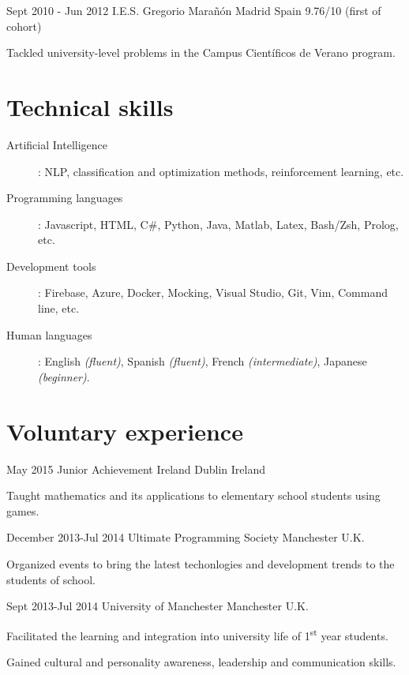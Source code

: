 \documentclass[10pt]{CurriculumVitae}
\begin{document}
      {Sept 2010 - Jun 2012}
      {I.E.S. Gregorio Marañón}
      {Madrid}
      {Spain}
      {9.76/10 (first of cohort)}
      {
         \item Tackled university-level problems in the Campus Científicos de Verano program.
      }


  \section{Technical skills}
    
    \begin{description}
       \item[Artificial Intelligence]: NLP, classification and optimization methods, reinforcement learning, etc.
       \item[Programming languages]: Javascript, HTML, C\#, Python, Java, Matlab, Latex, Bash/Zsh, Prolog, etc.
       \item[Development tools]: Firebase, Azure, Docker, Mocking, Visual Studio, Git, Vim, Command line, etc.
       \item[Human languages]: English \emph{(fluent)}, Spanish \emph{(fluent)}, French \emph{(intermediate)}, Japanese \emph{(beginner)}.
    \end{description}


  \section{Voluntary experience}
     
      {May 2015}
      {Junior Achievement Ireland}
      {Dublin}
      {Ireland}
      {
         \item Taught mathematics and its applications to elementary school students using games.
      }

      {December 2013-Jul 2014}
      {Ultimate Programming Society}
      {Manchester}
      {U.K.}
      {
         \item Organized events to bring the latest techonlogies and development trends to the students of school.
      }

      {Sept 2013-Jul 2014}
      {University of Manchester}
      {Manchester}
      {U.K.}
      {
         \item Facilitated the learning and integration into university life of 1\textsuperscript{st} year students.
         \item Gained cultural and personality awareness, leadership and communication skills.
      }
\end{document}
